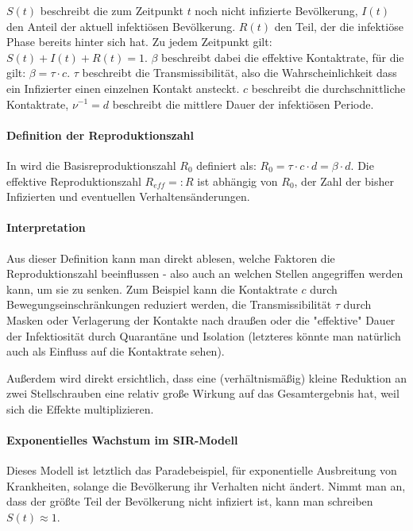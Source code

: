 \documentclass[a4paper]{article}
\begin{document}
    $S(t)$ beschreibt die zum Zeitpunkt $t$ noch nicht infizierte Bevölkerung, $I(t)$ den Anteil der aktuell infektiösen Bevölkerung. $R(t)$ den Teil, der die infektiöse Phase bereits hinter sich hat. Zu jedem Zeitpunkt gilt: $S(t)+I(t)+R(t) = 1$. $\beta$ beschreibt dabei die effektive Kontaktrate, für die gilt: $ \beta = \tau \cdot c $. $\tau$ beschreibt die Transmissibilität, also die Wahrscheinlichkeit dass ein Infizierter einen einzelnen Kontakt ansteckt. $c$ beschreibt die durchschnittliche Kontaktrate, $\nu^{-1} = d$ beschreibt die mittlere Dauer der infektiösen Periode. 

    \paragraph{Definition der Reproduktionszahl}In \cite{jonesOnR0} wird die Basisreproduktionszahl $R_0$ definiert als: $R_0 = \tau \cdot c \cdot d = \beta \cdot d$. Die effektive Reproduktionszahl $R_{eff} =: R$ ist abhängig von $R_0$, der Zahl der bisher Infizierten und eventuellen Verhaltensänderungen. 

    \paragraph{Interpretation}Aus dieser Definition kann man direkt ablesen, welche Faktoren die Reproduktionszahl beeinflussen - also auch an welchen Stellen angegriffen werden kann, um sie zu senken. Zum Beispiel kann die Kontaktrate $c$ durch Bewegungseinschränkungen reduziert werden, die Transmissibilität $\tau$ durch Masken oder Verlagerung der Kontakte nach draußen oder die "effektive" Dauer der Infektiosität durch Quarantäne und Isolation (letzteres könnte man natürlich auch als Einfluss auf die Kontaktrate sehen).
    
    Außerdem wird direkt ersichtlich, dass eine (verhältnismäßig) kleine Reduktion an zwei Stellschrauben eine relativ große Wirkung auf das Gesamtergebnis hat, weil sich die Effekte multiplizieren. 

    \paragraph{Exponentielles Wachstum im SIR-Modell}Dieses Modell ist letztlich das Paradebeispiel, für exponentielle Ausbreitung von Krankheiten, solange die Bevölkerung ihr Verhalten nicht ändert. Nimmt man an, dass der größte Teil der Bevölkerung nicht infiziert ist, kann man schreiben $S(t) \approx 1$.
\end{document}
